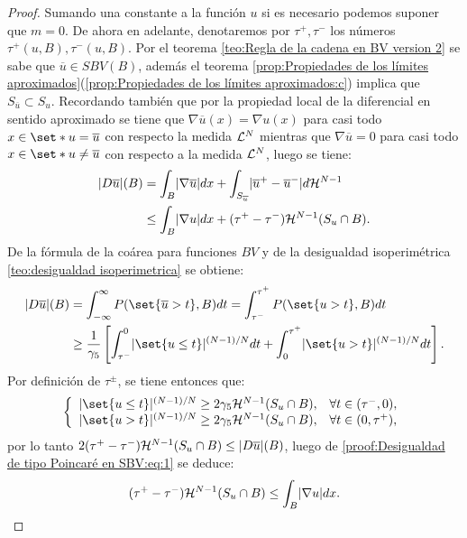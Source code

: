 \documentclass[a4paper,11pt,spanish, twoside, leqno]{tfm-uam}
\begin{document}
\begin{proof}
Sumando una constante a la función $u$ si es necesario podemos suponer que $m=0$. De ahora en adelante, denotaremos por $\tau^{+},\tau^{-}$ los números $\tau^{+}(u,B), \tau^{-}(u,B)$.
Por el teorema \ref{teo:Regla de la cadena en BV version 2} se sabe que $\overline{u}\in SBV(B)$, además el teorema \ref{prop:Propiedades de los límites aproximados}(\ref{prop:Propiedades de los límites aproximados:c}) implica que $S_{\overline{u}}\subset S_{u}$. Recordando también que por la propiedad local de la diferencial en sentido aproximado se tiene que $\nabla{\overline{u}}(x)=\nabla{u}(x)$ para casi todo $x\in \set*{u=\overline{u}}$ con respecto la medida $\mathcal{L}^{N}$ mientras que $\nabla{\overline{u}}=0$ para casi todo $x\in \set*{u\not =\overline{u}}$ con respecto a la medida $\mathcal{L}^{N}$, luego se tiene:
\begin{align}\label{proof:Desigualdad de tipo Poincaré en SBV:eq:1}
\lvert D\overline{u}\rvert(B)&=\int_{B}\lvert\nabla{\overline{u}}\rvert dx+\int_{S_{\overline{u}}}\lvert\overline{u}^{+}-\overline{u}^{-}\rvert d\mathcal{H}^{N-1}\nonumber
\\&\leq \int_{B}\lvert\nabla{u}\rvert dx+(\tau^{+}-\tau^{-})\mathcal{H}^{N-1}(S_{u}\cap B).
\end{align}
De la fórmula de la coárea para funciones $BV$ y de la desigualdad isoperimétrica \ref{teo:desigualdad isoperimetrica} se obtiene:
\begin{align*}
\abs{D\overline{u}}(B)&=\int^{\infty}_{-\infty}P(\set{\overline{u}>t},B)dt=\int^{\tau^{+}}_{\tau^{-}}P(\set{u>t},B)dt
\\&\geq \dfrac{1}{\gamma_{5}}\left [ \int_{\tau^{-}}^{0}\abs{\set{u\leq t}}^{(N-1)/N}dt+\int^{\tau^{+}}_{0}\abs{\set{u>t}}^{(N-1)/N}dt\right ].
\end{align*}
Por definición de $\tau^{\pm}$, se tiene entonces que:
\begin{align*}
\left \{ \begin{array}{ll}
\abs{\set{u\leq t}}^{(N-1)/N}\geq 2\gamma_{5}\Hm{N-1}(S_{u}\cap B),& \forall t\in (\tau^{-},0),\\
\abs{\set{u> t}}^{(N-1)/N}\geq 2\gamma_{5}\Hm{N-1}(S_{u}\cap B),&\forall t\in (0,\tau^{+}),
\end{array}\right.
\end{align*}
por lo tanto $2(\tau^{+}-\tau^{-})\mathcal{H}^{N-1}(S_{u}\cap B)\leq \lvert D\overline{u}\rvert(B)$, luego de \ref{proof:Desigualdad de tipo Poincaré en SBV:eq:1} se deduce:
\begin{align*}
(\tau^{+}-\tau^{-})\Hm{N-1}(S_{u}\cap B)\leq \int_{B}\abs{\nabla{u}}dx.

\end{align*}
\end{proof}
\end{document}
